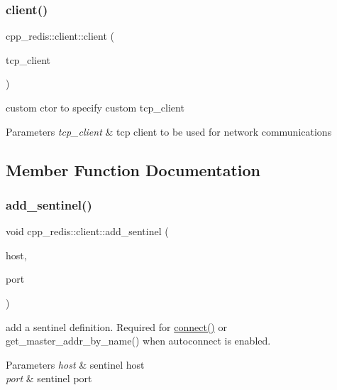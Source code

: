 \subsubsection{\texorpdfstring{client()}{client()}}
{\footnotesize\ttfamily cpp\+\_\+redis\+::client\+::client (\begin{DoxyParamCaption}\item[{const std\+::shared\+\_\+ptr$<$ \hyperlink{classcpp__redis_1_1network_1_1tcp__client__iface}{network\+::tcp\+\_\+client\+\_\+iface} $>$ \&}]{tcp\+\_\+client }\end{DoxyParamCaption})\hspace{0.3cm}{\ttfamily [explicit]}}

custom ctor to specify custom tcp\+\_\+client


\begin{DoxyParams}{Parameters}
{\em tcp\+\_\+client} & tcp client to be used for network communications \\
\hline
\end{DoxyParams}


\subsection{Member Function Documentation}
\mbox{\label{classcpp__redis_1_1client_a7050eb52856decad9ab2060a139f4b48}} 
\subsubsection{\texorpdfstring{add\+\_\+sentinel()}{add\_sentinel()}}
{\footnotesize\ttfamily void cpp\+\_\+redis\+::client\+::add\+\_\+sentinel (\begin{DoxyParamCaption}\item[{const std\+::string \&}]{host,  }\item[{std\+::size\+\_\+t}]{port }\end{DoxyParamCaption})}

add a sentinel definition. Required for \hyperlink{classcpp__redis_1_1client_adda8b3e7b4f9c80ac052753b39178dd5}{connect()} or get\+\_\+master\+\_\+addr\+\_\+by\+\_\+name() when autoconnect is enabled.


\begin{DoxyParams}{Parameters}
{\em host} & sentinel host \\
\hline
{\em port} & sentinel port \\
\hline
\end{DoxyParams}
\mbox{\label{classcpp__redis_1_1client_adb605a877f65b8f54725576b45aeeca6}} 
